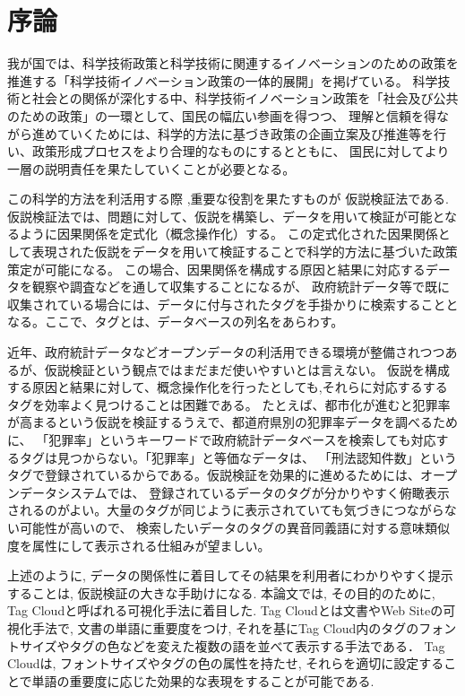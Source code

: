 \documentclass[sotsuron]{kuee}
\begin{document}
\chapter{序論}

我が国では、科学技術政策と科学技術に関連するイノベーションのための政策を推進する「科学技術イノベーション政策の一体的展開」を掲げている\cite{1-1}。
科学技術と社会との関係が深化する中、科学技術イノベーション政策を「社会及び公共のための政策」の一環として、国民の幅広い参画を得つつ、
理解と信頼を得ながら進めていくためには、科学的方法に基づき政策の企画立案及び推進等を行い、政策形成プロセスをより合理的なものにするとともに、
国民に対してより一層の説明責任を果たしていくことが必要となる。

この科学的方法を利活用する際 ,重要な役割を果たすものが 仮説検証法である\cite{1-2}.
仮説検証法では、問題に対して、仮説を構築し、データを用いて検証が可能となるように因果関係を定式化（概念操作化）する。
この定式化された因果関係として表現された仮説をデータを用いて検証することで科学的方法に基づいた政策策定が可能になる。
この場合、因果関係を構成する原因と結果に対応するデータを観察や調査などを通して収集することになるが、
政府統計データ等で既に収集されている場合には、データに付与されたタグを手掛かりに検索することとなる。ここで、タグとは、データベースの列名をあらわす。

近年、政府統計データなどオープンデータの利活用できる環境が整備されつつあるが、仮説検証という観点ではまだまだ使いやすいとは言えない。
仮説を構成する原因と結果に対して、概念操作化を行ったとしても,それらに対応するするタグを効率よく見つけることは困難である。
たとえば、都市化が進むと犯罪率が高まるという仮説を検証するうえで、都道府県別の犯罪率データを調べるために、
「犯罪率」というキーワードで政府統計データベースを検索しても対応するタグは見つからない。「犯罪率」と等価なデータは、
「刑法認知件数」というタグで登録されているからである。仮説検証を効果的に進めるためには、オープンデータシステムでは、
登録されているデータのタグが分かりやすく俯瞰表示されるのがよい。大量のタグが同じように表示されていても気づきにつながらない可能性が高いので、
検索したいデータのタグの異音同義語に対する意味類似度を属性にして表示される仕組みが望ましい。

上述のように, データの関係性に着目してその結果を利用者にわかりやすく提示することは, 仮説検証の大きな手助けになる.
本論文では, その目的のために, Tag Cloudと呼ばれる可視化手法に着目した.
Tag Cloudとは文書やWeb Siteの可視化手法で, 文書の単語に重要度をつけ,
それを基にTag Cloud内のタグのフォントサイズやタグの色などを変えた複数の語を並べて表示する手法である．
Tag Cloudは, フォントサイズやタグの色の属性を持たせ, それらを適切に設定することで単語の重要度に応じた効果的な表現をすることが可能である.
\end{document}
